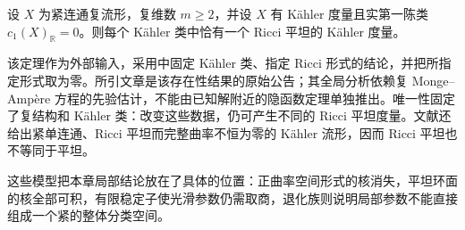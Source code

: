 \begin{theorem}\label{g3:thm:kahler-ricci-flat-existence-input}
	设 \(X\) 为紧连通复流形，复维数 \(m\ge2\)，并设 \(X\) 有 Kähler 度量且实第一陈类 \(c_1(X)_{\mathbb R}=0\)。则每个 Kähler 类中恰有一个 Ricci 平坦的 Kähler 度量。
\end{theorem}
该定理作为外部输入，采用\cite[定理1，第1798页]{Yau1977Calabi}中固定 Kähler 类、指定 Ricci 形式的结论，并把所指定形式取为零。所引文章是该存在性结果的原始公告；其全局分析依赖复 Monge--Ampère 方程的先验估计，不能由已知解附近的隐函数定理单独推出。唯一性固定了复结构和 Kähler 类：改变这些数据，仍可产生不同的 Ricci 平坦度量。文献\cite[定理2，第1798页]{Yau1977Calabi}还给出紧单连通、Ricci 平坦而完整曲率不恒为零的 Kähler 流形，因而 Ricci 平坦也不等同于平坦。

这些模型把本章局部结论放在了具体的位置：正曲率空间形式的核消失，平坦环面的核全部可积，有限稳定子使光滑参数仍需取商，退化族则说明局部参数不能直接组成一个紧的整体分类空间。

